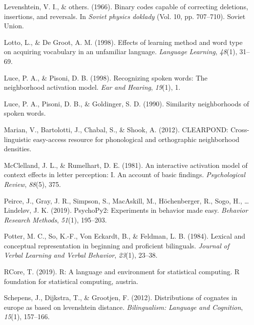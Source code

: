 \documentclass[
  english,
  man,floatsintext]{apa6}
\newlength{\cslhangindent}
\newenvironment{CSLReferences}[2] %
 {%
  \setlength{\parindent}{0pt}
  \ifodd #1 \everypar{\setlength{\hangindent}{\cslhangindent}}\ignorespaces\fi
  \ifnum #2 > 0
  \setlength{\parskip}{#2\baselineskip}
  \fi
 }%
 {}
\begin{document}
\begin{CSLReferences}{1}{0}
\leavevmode{}%
Levenshtein, V. I., \& others. (1966). Binary codes capable of correcting deletions, insertions, and reversals. In \emph{Soviet physics doklady} (Vol. 10, pp. 707--710). Soviet Union.

\leavevmode{}%
Lotto, L., \& De Groot, A. M. (1998). Effects of learning method and word type on acquiring vocabulary in an unfamiliar language. \emph{Language Learning}, \emph{48}(1), 31--69.

\leavevmode{}%
Luce, P. A., \& Pisoni, D. B. (1998). Recognizing spoken words: The neighborhood activation model. \emph{Ear and Hearing}, \emph{19}(1), 1.

\leavevmode{}%
Luce, P. A., Pisoni, D. B., \& Goldinger, S. D. (1990). Similarity neighborhoods of spoken words.

\leavevmode{}%
Marian, V., Bartolotti, J., Chabal, S., \& Shook, A. (2012). CLEARPOND: Cross-linguistic easy-access resource for phonological and orthographic neighborhood densities.

\leavevmode{}%
McClelland, J. L., \& Rumelhart, D. E. (1981). An interactive activation model of context effects in letter perception: I. An account of basic findings. \emph{Psychological Review}, \emph{88}(5), 375.

\leavevmode{}%
Peirce, J., Gray, J. R., Simpson, S., MacAskill, M., Höchenberger, R., Sogo, H., \ldots{} Lindeløv, J. K. (2019). PsychoPy2: Experiments in behavior made easy. \emph{Behavior Research Methods}, \emph{51}(1), 195--203.

\leavevmode{}%
Potter, M. C., So, K.-F., Von Eckardt, B., \& Feldman, L. B. (1984). Lexical and conceptual representation in beginning and proficient bilinguals. \emph{Journal of Verbal Learning and Verbal Behavior}, \emph{23}(1), 23--38.

\leavevmode{}%
RCore, T. (2019). R: A language and environment for statistical computing. R foundation for statistical computing, austria.

\leavevmode{}%
Schepens, J., Dijkstra, T., \& Grootjen, F. (2012). Distributions of cognates in europe as based on levenshtein distance. \emph{Bilingualism: Language and Cognition}, \emph{15}(1), 157--166.


\end{CSLReferences}
\end{document}
